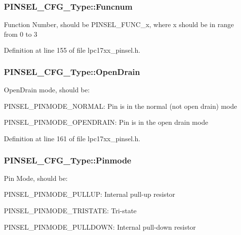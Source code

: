 \subsubsection[{\texorpdfstring{Funcnum}{Funcnum}}]{ P\+I\+N\+S\+E\+L\+\_\+\+C\+F\+G\+\_\+\+Type\+::\+Funcnum}\hypertarget{struct_p_i_n_s_e_l___c_f_g___type_a3a18a3aab63914a40dad89c8272ad4f4}{}\label{struct_p_i_n_s_e_l___c_f_g___type_a3a18a3aab63914a40dad89c8272ad4f4}
Function Number, should be P\+I\+N\+S\+E\+L\+\_\+\+F\+U\+N\+C\+\_\+x, where x should be in range from 0 to 3 

Definition at line 155 of file lpc17xx\+\_\+pinsel.\+h.

\subsubsection[{\texorpdfstring{Open\+Drain}{OpenDrain}}]{ P\+I\+N\+S\+E\+L\+\_\+\+C\+F\+G\+\_\+\+Type\+::\+Open\+Drain}\hypertarget{struct_p_i_n_s_e_l___c_f_g___type_af5bbd6b617833ebc7d0da0ed8b8fe595}{}\label{struct_p_i_n_s_e_l___c_f_g___type_af5bbd6b617833ebc7d0da0ed8b8fe595}
Open\+Drain mode, should be\+:
\begin{DoxyItemize}
\item P\+I\+N\+S\+E\+L\+\_\+\+P\+I\+N\+M\+O\+D\+E\+\_\+\+N\+O\+R\+M\+AL\+: Pin is in the normal (not open drain) mode
\item P\+I\+N\+S\+E\+L\+\_\+\+P\+I\+N\+M\+O\+D\+E\+\_\+\+O\+P\+E\+N\+D\+R\+A\+IN\+: Pin is in the open drain mode 
\end{DoxyItemize}

Definition at line 161 of file lpc17xx\+\_\+pinsel.\+h.

\subsubsection[{\texorpdfstring{Pinmode}{Pinmode}}]{ P\+I\+N\+S\+E\+L\+\_\+\+C\+F\+G\+\_\+\+Type\+::\+Pinmode}\hypertarget{struct_p_i_n_s_e_l___c_f_g___type_a04c559184af47bae47fd03f6e8430145}{}\label{struct_p_i_n_s_e_l___c_f_g___type_a04c559184af47bae47fd03f6e8430145}
Pin Mode, should be\+:
\begin{DoxyItemize}
\item P\+I\+N\+S\+E\+L\+\_\+\+P\+I\+N\+M\+O\+D\+E\+\_\+\+P\+U\+L\+L\+UP\+: Internal pull-\/up resistor
\item P\+I\+N\+S\+E\+L\+\_\+\+P\+I\+N\+M\+O\+D\+E\+\_\+\+T\+R\+I\+S\+T\+A\+TE\+: Tri-\/state
\item P\+I\+N\+S\+E\+L\+\_\+\+P\+I\+N\+M\+O\+D\+E\+\_\+\+P\+U\+L\+L\+D\+O\+WN\+: Internal pull-\/down resistor 
\end{DoxyItemize}

